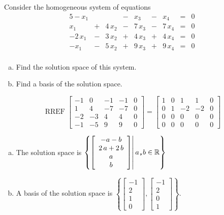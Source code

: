 
\begin{exerciseStatement}


Consider the homogeneous system of equations 
\begin{alignat*}{5} -x_{1} & &  &-& x_{3} &-& x_{4} &=& 0 \\x_{1} &+& 4 \, x_{2} &-& 7 \, x_{3} &-& 7 \, x_{4} &=& 0 \\-2 \, x_{1} &-& 3 \, x_{2} &+& 4 \, x_{3} &+& 4 \, x_{4} &=& 0 \\-x_{1} &-& 5 \, x_{2} &+& 9 \, x_{3} &+& 9 \, x_{4} &=& 0 \\ \end{alignat*}
            


\begin{enumerate}[(a)]
\item  Find the solution space of this system.
\item  Find a basis of the solution space.
\end{enumerate}
    
\end{exerciseStatement}
    
\begin{exerciseAnswer} 


\[\operatorname{RREF} \left[\begin{array}{cccc|c}
-1 & 0 & -1 & -1 & 0 \\
1 & 4 & -7 & -7 & 0 \\
-2 & -3 & 4 & 4 & 0 \\
-1 & -5 & 9 & 9 & 0
\end{array}\right] = \left[\begin{array}{cccc|c}
1 & 0 & 1 & 1 & 0 \\
0 & 1 & -2 & -2 & 0 \\
0 & 0 & 0 & 0 & 0 \\
0 & 0 & 0 & 0 & 0
\end{array}\right] \]


\begin{enumerate}[(a)]
\item The solution space is \( \left\{ \left[\begin{array}{c}
-a - b \\
2 \, a + 2 \, b \\
a \\
b
\end{array}\right] \middle|\,a\text{\texttt{,}}b\in\mathbb{R}\right\} \)
\item A basis of the solution space is \( \left\{ \left[\begin{array}{c}
-1 \\
2 \\
1 \\
0
\end{array}\right] , \left[\begin{array}{c}
-1 \\
2 \\
0 \\
1
\end{array}\right] \right\} \).
\end{enumerate}
    
\end{exerciseAnswer}
    
